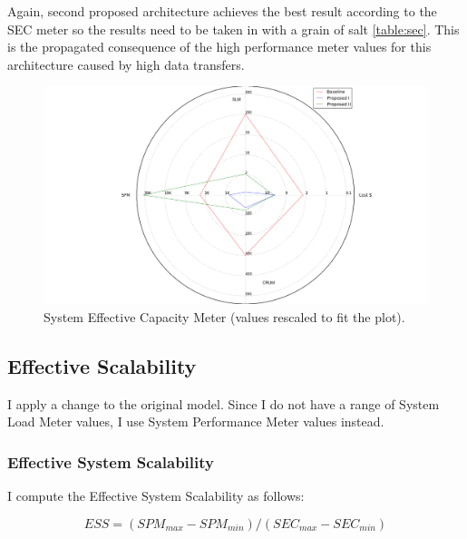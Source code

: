 \documentclass{uvamscse}
\begin{document}
Again, second proposed architecture achieves the best result according to the SEC meter so the results need to be taken in with a grain of salt \ref{table:sec}. This is the propagated consequence of the high performance meter values for this architecture caused by high data transfers.

\begin{figure}[H]
\centering
\includegraphics[scale=0.3]{secplot}
\caption{System Effective Capacity Meter (values rescaled to fit the plot).}
\label{figure:secplot}
\end{figure}

\subsection{Effective Scalability}
I apply a change to the original model. Since I do not have a range of System Load Meter values, I use System Performance Meter values instead.

\subsubsection{Effective System Scalability}
I compute the Effective System Scalability as follows:

$$ESS = (SPM_{max} - SPM_{min}) / (SEC_{max}-SEC_{min})$$
\end{document}
